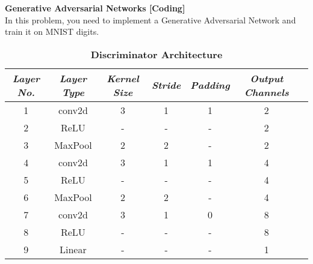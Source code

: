 \begin{Q}
	\textbf{\Large Generative Adversarial Networks [Coding]}\\
	
	In this problem, you need to implement a Generative Adversarial Network and train it on MNIST digits.
	
	\begin{table}[h]
		\begin{center}
			\caption{\textbf{Discriminator Architecture}}
			\label{GAN: dis}
			\begin{tabular}{ccccccc}
				\toprule
				{\small\textit{Layer No.}}
				& {\small \textit{Layer Type}}
				& {\small \textit{Kernel Size}}
				& {\small \textit{Stride}}
				& {\small \textit{Padding}}
				& {\small \textit{Output Channels}} \\
				\midrule
				1 & conv2d   & 3 & 1 & 1 & 2 \\
				2 & ReLU     & - & - & - & 2 \\
				3 & MaxPool  & 2 & 2 & - & 2 \\
				4 & conv2d   & 3 & 1 & 1 & 4 \\
				5 & ReLU     & - & - & - & 4 \\
				6 & MaxPool  & 2 & 2 & - & 4 \\
				7 & conv2d   & 3 & 1 & 0 & 8 \\
				8 & ReLU     & - & - & - & 8 \\
				9 & Linear   & - & - & - & 1 \\
				\bottomrule
			\end{tabular}
		\end{center}
	\end{table}
	

\end{Q}
